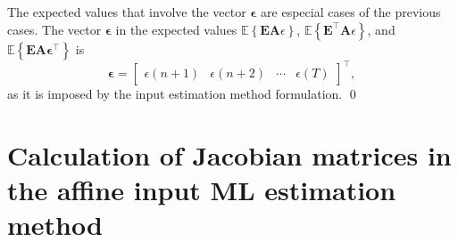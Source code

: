 \begin{pf}
The expected values that involve the vector $\bm{\epsilon}$ are especial cases of the previous cases. 
The vector $\bm{\epsilon}$ in the expected values $\mathbb{E} \left\{ \mathbf{E} \mathbf{A} \epsilon \right\}$, $\mathbb{E} \left\{ \mathbf{E}^\top \mathbf{A} \epsilon \right\}$, and $\mathbb{E} \left\{ \mathbf{E} \mathbf{A} \bm{\epsilon}^\top \right\}$ is
\begin{equation} \bm{\epsilon} = \begin{bmatrix} \epsilon(n+1) & \epsilon(n+2) & \cdots & \epsilon(T) \end{bmatrix}^\top, \end{equation}
as it is imposed by the input estimation method formulation.
\qed \end{pf}


\section[Calculation of Jacobian matrices in the affine input ML estimation method]{Calculation of Jacobian matrices \linebreak in the affine input ML estimation method \label{appendix:Jacobians} }

